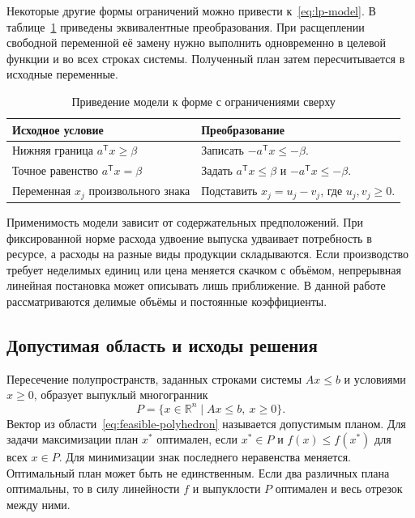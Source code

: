 Некоторые другие формы ограничений можно привести к~\eqref{eq:lp-model}.
В таблице~\ref{tab:lp-reformulations} приведены эквивалентные
преобразования. При расщеплении свободной переменной её замену нужно
выполнить одновременно в целевой функции и во всех строках системы.
Полученный план затем пересчитывается в исходные переменные.

\begin{table}[htbp]
  \caption{Приведение модели к форме с ограничениями сверху}
  \label{tab:lp-reformulations}
  \centering
  \begin{tabularx}{\textwidth}{@{}>{\raggedright\arraybackslash}X
      >{\raggedright\arraybackslash}X@{}}
    \toprule
    Исходное условие & Преобразование \\
    \midrule
    Нижняя граница $a^{\mathsf T}x\ge\beta$
      & Записать $-a^{\mathsf T}x\le-\beta$. \\
    Точное равенство $a^{\mathsf T}x=\beta$
      & Задать $a^{\mathsf T}x\le\beta$ и $-a^{\mathsf T}x\le-\beta$. \\
    Переменная $x_j$ произвольного знака
      & Подставить $x_j=u_j-v_j$, где $u_j,v_j\ge0$. \\
    \bottomrule
  \end{tabularx}
\end{table}

Применимость модели зависит от содержательных предположений.
При фиксированной норме расхода удвоение выпуска удваивает потребность
в ресурсе, а расходы на разные виды продукции складываются. Если
производство требует неделимых единиц или цена меняется скачком с
объёмом, непрерывная линейная постановка может описывать лишь приближение.
В данной работе рассматриваются делимые объёмы и постоянные коэффициенты.

\subsection{Допустимая область и исходы решения}

Пересечение полупространств, заданных строками системы $Ax\le b$
и условиями $x\ge 0$, образует выпуклый многогранник
\begin{equation}
  P=\{x\in\mathbb{R}^{n}\mid Ax\le b,\ x\ge 0\}.
  \label{eq:feasible-polyhedron}
\end{equation}
Вектор из области~\eqref{eq:feasible-polyhedron} называется допустимым планом.
Для задачи максимизации
план $x^{*}$ оптимален, если $x^{*}\in P$ и $f(x)\le f(x^{*})$ для
всех $x\in P$. Для минимизации знак последнего неравенства меняется.
Оптимальный план может быть не единственным. Если два различных плана
оптимальны, то в силу линейности $f$ и выпуклости $P$ оптимален и весь
отрезок между ними.


